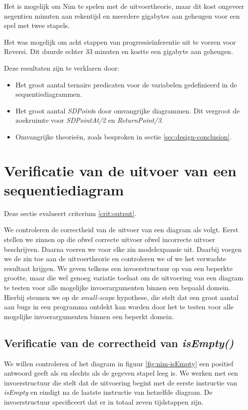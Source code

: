 Het is mogelijk om Nim te spelen met de uitvoertheorie, maar dit kost ongeveer negentien minuten aan rekentijd en meerdere gigabytes aan geheugen voor een spel met twee stapels.

Het was mogelijk om acht stappen van progressie\"inferentie uit te voeren voor Reversi. Dit duurde echter 33 minuten en kostte een gigabyte aan geheugen.

Deze resultaten zijn te verklaren door:

\begin{itemize}
	\item Het groot aantal ternaire predicaten voor de variabelen gedefinieerd in de sequentiediagrammen.
	\item Het groot aantal \textit{SDPoint}s door omvangrijke diagrammen. Dit vergroot de zoekruimte voor \textit{SDPointAt/2} en \textit{ReturnPoint/3}.
	\item Omvangrijke theorie\"en, zoals besproken in sectie \ref{sec:design-conclusion}.
\end{itemize}

\section{Verificatie van de uitvoer van een sequentiediagram}\label{sec:verify-output}

Deze sectie evalueert criterium \ref{crit:output}.

We controleren de correctheid van de uitvoer van een diagram als volgt. Eerst stellen we zinnen op die ofwel correcte uitvoer ofwel incorrecte uitvoer beschrijven. Daarna voeren we voor elke zin modelexpansie uit. Daarbij voegen we de zin toe aan de uitvoertheorie en controleren we of we het verwachte resultaat krijgen. We geven telkens een invoerstructuur op van een beperkte grootte, maar die wel genoeg variatie toelaat om de uitvoering van een diagram te testen voor alle mogelijke invoerargumenten binnen een bepaald domein. Hierbij steunen we op de \textit{small-scope} hypothese\cite{andoni2003evaluating}, die stelt dat een groot aantal aan bugs in een programma ontdekt kan worden door het te testen voor alle mogelijke invoerargumenten binnen een beperkt domein.

\subsection{Verificatie van de correctheid van \textit{isEmpty()}}

We willen controleren of het diagram in figuur \ref{fig:nim-isEmpty} een positief antwoord geeft als en slechts als de gegeven stapel leeg is. We werken met een invoerstructuur die stelt dat de uitvoering begint met de eerste instructie van \textit{isEmpty} en eindigt na de laatste instructie van hetzelfde diagram. De invoerstructuur specificeert dat er in totaal zeven tijdstappen zijn.

